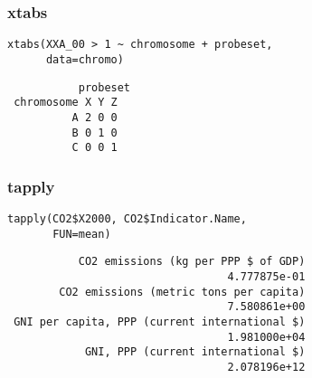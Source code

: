\documentclass[xcolor={usenames,svgnames,dvipsnames}]{beamer}
\begin{document}
\begin{frame}[fragile]
\frametitle{xtabs}
\label{sec-3-3}


\lstset{language=R}
\begin{lstlisting}
xtabs(XXA_00 > 1 ~ chromosome + probeset,
      data=chromo)
\end{lstlisting}

\begin{verbatim}
           probeset
 chromosome X Y Z
          A 2 0 0
          B 0 1 0
          C 0 0 1
\end{verbatim}
\end{frame}
\begin{frame}[fragile]
\frametitle{tapply}
\label{sec-3-4}


\lstset{language=R}
\begin{lstlisting}
tapply(CO2$X2000, CO2$Indicator.Name,
       FUN=mean)
\end{lstlisting}

\begin{verbatim}
           CO2 emissions (kg per PPP $ of GDP) 
                                  4.777875e-01 
        CO2 emissions (metric tons per capita) 
                                  7.580861e+00 
 GNI per capita, PPP (current international $) 
                                  1.981000e+04 
            GNI, PPP (current international $) 
                                  2.078196e+12
\end{verbatim}
\end{frame}
\end{document}

